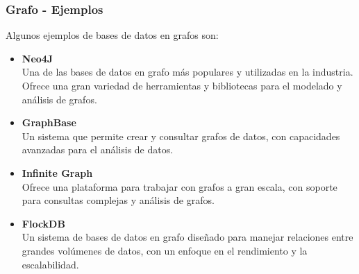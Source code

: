 \begin{frame}
    \frametitle{Grafo - Ejemplos}
    Algunos ejemplos de bases de datos en grafos son:
    
     

    \begin{itemize}
        \item \textbf{Neo4J}\\
        Una de las bases de datos en grafo más populares y utilizadas en la industria. Ofrece una gran variedad de herramientas y bibliotecas para el modelado y análisis de grafos.

         

        \item \textbf{GraphBase}\\ 
        Un sistema que permite crear y consultar grafos de datos, con capacidades avanzadas para el análisis de datos.

         
        
        \item \textbf{Infinite Graph}\\
        Ofrece una plataforma para trabajar con grafos a gran escala, con soporte para consultas complejas y análisis de grafos.    
        
         

        \item \textbf{FlockDB}\\
        Un sistema de bases de datos en grafo diseñado para manejar relaciones entre grandes volúmenes de datos, con un enfoque en el rendimiento y la escalabilidad.
    \end{itemize}
    
\end{frame}